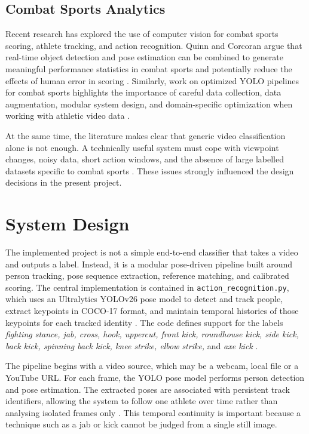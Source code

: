 \documentclass[12pt]{article}
\begin{document}
\subsection{Combat Sports Analytics}
Recent research has explored the use of computer vision for combat sports scoring, athlete tracking, and action recognition. Quinn and Corcoran argue that real-time object detection and pose estimation can be combined to generate meaningful performance statistics in combat sports and potentially reduce the effects of human error in scoring \cite{quinn2024automation}. Similarly, work on optimized YOLO pipelines for combat sports highlights the importance of careful data collection, data augmentation, modular system design, and domain-specific optimization when working with athletic video data \cite{quinn2025yolo}.

At the same time, the literature makes clear that generic video classification alone is not enough. A technically useful system must cope with viewpoint changes, noisy data, short action windows, and the absence of large labelled datasets specific to combat sports \cite{wu2024sthka,quinn2025yolo}. These issues strongly influenced the design decisions in the present project.

\section{System Design}
The implemented project is not a simple end-to-end classifier that takes a video and outputs a label. Instead, it is a modular pose-driven pipeline built around person tracking, pose sequence extraction, reference matching, and calibrated scoring. The central implementation is contained in \texttt{action\_recognition.py}, which uses an Ultralytics YOLOv26 pose model to detect and track people, extract keypoints in COCO-17 format, and maintain temporal histories of those keypoints for each tracked identity \cite{projectActionRecognition}. The code defines support for the labels \textit{fighting stance, jab, cross, hook, uppercut, front kick, roundhouse kick, side kick, back kick, spinning back kick, knee strike, elbow strike,} and \textit{axe kick} \cite{projectActionRecognition}.

The pipeline begins with a video source, which may be a webcam, local file or a YouTube URL. For each frame, the YOLO pose model performs person detection and pose estimation. The extracted poses are associated with persistent track identifiers, allowing the system to follow one athlete over time rather than analysing isolated frames only \cite{projectActionRecognition}. This temporal continuity is important because a technique such as a jab or kick cannot be judged from a single still image.
\end{document}
